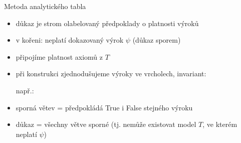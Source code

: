 \documentclass{beamer}
\begin{document}
\begin{frame}{Metoda analytického tabla}

\begin{itemize}
    \item důkaz je strom olabelovaný předpoklady o platnosti výroků
    \item v kořeni: \alert{neplatí} dokazovaný výrok $\psi$ (důkaz sporem)
    \item připojíme platnost axiomů z $T$
    
    \pause
    \item při konstrukci zjednodušujeme výroky ve vrcholech, \alert{invariant}:
    
    \pause
    \bigskip

    \pause
    
    \bigskip

    např.:
    
    \bigskip
    \smallskip    
        
    \pause

    \item \alert{sporná} větev = předpokládá True i False stejného výroku
    \item \alert{důkaz} = všechny větve sporné (tj. nemůže existovat model $T$, ve kterém neplatí $\psi$)
\end{itemize}

\end{frame}
\end{document}
